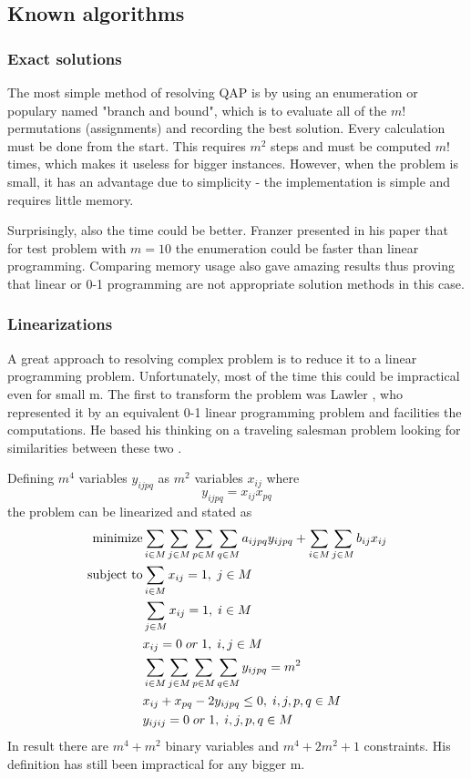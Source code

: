 \subsection{Known algorithms}
\subsubsection{Exact solutions}

The most simple method of resolving QAP is by using an enumeration or populary named "branch and bound", which is to evaluate all of the $m!$ permutations (assignments) and recording the best solution.
Every calculation must be done from the start.
This requires $m^2$ steps and must be computed $m!$ times, which makes it useless for bigger instances.
However, when the problem is small, it has an advantage due to simplicity - the implementation is simple and requires little memory.

Surprisingly, also the time could be better. Franzer presented in his paper \cite{frazer1997602} that for test problem with $m=10$ the enumeration could be faster than linear programming. Comparing memory usage also gave amazing results thus proving that linear or 0-1 programming are not appropriate solution methods in this case.

\subsubsection{Linearizations}
A great approach to resolving complex problem is to reduce it to a linear programming problem.
Unfortunately, most of the time this could be impractical even for small m.
The first to transform the problem was Lawler \cite{lawler1963}, who represented it by an equivalent 0-1 linear programming problem and facilities the computations. He based his thinking on a traveling salesman problem looking for similarities between these two \cite{charnsethikul1988exact}.

Defining $m^4$ variables $y_{ijpq}$ as $m^2$ variables $x_{ij}$ where
\begin{equation}
y_{ijpq} = x_{ij}x_{pq}
\end{equation}
the problem can be linearized and stated as
\begin{align}
  \text{minimize} &\null \sum_{i \in M} \sum_{j \in M} \sum_{p \in M} \sum_{q \in M} a_{ijpq}y_{ijpq} + \sum_{i \in M} \sum_{j \in M} b_{ij} x_{ij} \\
  \text{subject to} &\null \sum_{i \in M} x_{ij} = 1, \; j \in M \\
  &\null \sum_{j \in M} x_{ij} = 1, \; i \in M \\
  &\null x_{ij} = 0 \; or \; 1, \; i, j \in M \\
  &\null \sum_{i \in M} \sum_{j \in M} \sum_{p \in M} \sum_{q \in M} y_{ijpq} = m^2 \; \\
  &\null x_{ij} + x_{pq} - 2y_{ijpq} \leq 0, \; i, j, p, q \in M \\
  &\null y_{ijij} = 0 \; or \; 1, \; i, j, p, q \in M \\
\end{align}
In result there are $m^4 + m^2$ binary variables and $m^4 + 2 m^2 + 1$ constraints.
His definition has still been impractical for any bigger m.

